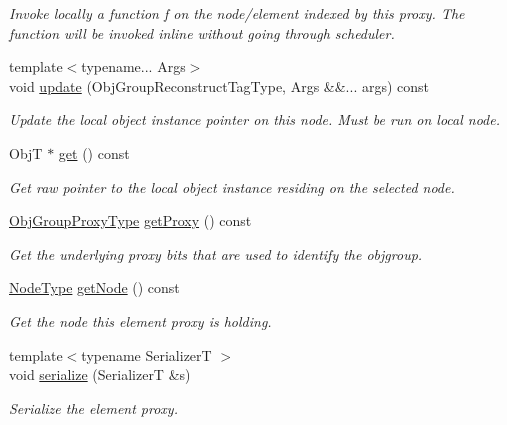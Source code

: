 \begin{DoxyCompactItemize}
\begin{DoxyCompactList}\small\item\em Invoke locally a function \textquotesingle{}f\textquotesingle{} on the node/element indexed by this proxy. The function will be invoked inline without going through scheduler. \end{DoxyCompactList}\item 
{\footnotesize template$<$typename... Args$>$ }\\void \hyperlink{structvt_1_1objgroup_1_1proxy_1_1_proxy_elm_ac86c33cf46c63e61413b07509d3b9005}{update} (Obj\+Group\+Reconstruct\+Tag\+Type, Args \&\&... args) const
\begin{DoxyCompactList}\small\item\em Update the local object instance pointer on this node. Must be run on local node. \end{DoxyCompactList}\item 
ObjT $\ast$ \hyperlink{structvt_1_1objgroup_1_1proxy_1_1_proxy_elm_a4acec5b08c91f8d23a19cc6a61b19c48}{get} () const
\begin{DoxyCompactList}\small\item\em Get raw pointer to the local object instance residing on the selected node. \end{DoxyCompactList}\item 
\hyperlink{namespacevt_ad7cae989df485fccca57f0792a880a8e}{Obj\+Group\+Proxy\+Type} \hyperlink{structvt_1_1objgroup_1_1proxy_1_1_proxy_elm_ae7cbfe997421f265fa51cd29adc6957e}{get\+Proxy} () const
\begin{DoxyCompactList}\small\item\em Get the underlying proxy bits that are used to identify the objgroup. \end{DoxyCompactList}\item 
\hyperlink{namespacevt_a866da9d0efc19c0a1ce79e9e492f47e2}{Node\+Type} \hyperlink{structvt_1_1objgroup_1_1proxy_1_1_proxy_elm_a2a2067c00f4d5bc4b07dfb371f2f0d7a}{get\+Node} () const
\begin{DoxyCompactList}\small\item\em Get the node this element proxy is holding. \end{DoxyCompactList}\item 
{\footnotesize template$<$typename SerializerT $>$ }\\void \hyperlink{structvt_1_1objgroup_1_1proxy_1_1_proxy_elm_aa2c6be8bfa1113516cd6e8b3d7bd0445}{serialize} (SerializerT \&s)
\begin{DoxyCompactList}\small\item\em Serialize the element proxy. \end{DoxyCompactList}\end{DoxyCompactItemize}
